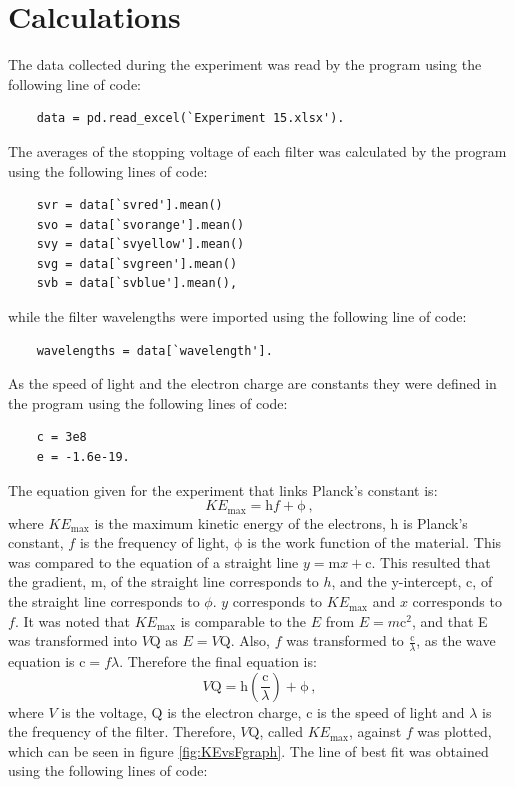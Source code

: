 \documentclass[12pt, a4paper]{article}
\begin{document}
\section*{Calculations}
The data collected during the experiment was read by the program using the following line of code:
\begin{lstlisting}
    data = pd.read_excel(`Experiment 15.xlsx').
\end{lstlisting}
The averages of the stopping voltage of each filter was calculated by the program using the following lines of code:
\begin{lstlisting}
    svr = data[`svred'].mean()
    svo = data[`svorange'].mean()
    svy = data[`svyellow'].mean()
    svg = data[`svgreen'].mean()
    svb = data[`svblue'].mean(),
\end{lstlisting}
while the filter wavelengths were imported using the following line of code:
\begin{lstlisting}
    wavelengths = data[`wavelength'].
\end{lstlisting}
As the speed of light and the electron charge are constants they were defined in the program using the following lines of code:
\begin{lstlisting}
    c = 3e8
    e = -1.6e-19.
\end{lstlisting}
The equation given for the experiment that links Planck's constant is:
\begin{equation}
    K E_{\mathrm{max}} = \textrm{h}f + \mathrm{\phi} \,,
\end{equation}
where $K E_{\textrm{max}}$ is the maximum kinetic energy of the electrons, h is Planck's constant, $f$ is the frequency of light, $\mathrm{\phi}$ is the work function of the material. This was compared to the equation of a straight line $y=\text{m} x+\text{c}$. This resulted that the gradient, $\text{m}$, of the straight line corresponds to $h$, and the y-intercept, $\text{c}$, of the straight line corresponds to $\phi$.  $y$ corresponds to $K E_{\textrm{max}}$ and $x$ corresponds to $f$. It was noted that $K E_{\textrm{max}}$ is comparable to the $E$ from $E=m \text{c}^2$, and that E was transformed into $V \text{Q}$ as $E=V \text{Q}$. Also, $f$ was transformed to $\frac{\text{c}}{\lambda}$, as the wave equation is $\text{c}=f\lambda$. Therefore the final equation is:
\begin{equation}
    V \text{Q} = \text{h}\left(\frac{\text{c}}{\lambda}\right) + \mathrm{\phi} \,,
\end{equation}
where $V$ is the voltage, $\text{Q}$ is the electron charge, $\text{c}$ is the speed of light and $\lambda$ is the frequency of the filter. Therefore, $V \text{Q}$, called $K E_{\text{max}}$, against $f$ was plotted, which can be seen in figure \ref{fig:KEvsFgraph}. The line of best fit was obtained using the following lines of code:
\end{document}
